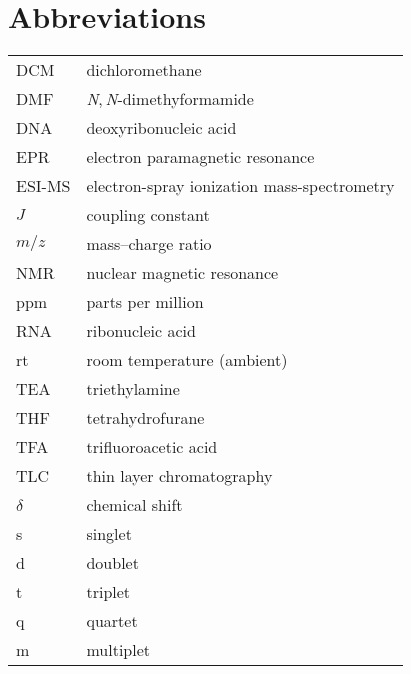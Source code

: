 \section*{Abbreviations}

\begin{table}[h]
\begin{tabular}{ll}
DCM & dichloromethane\\
DMF & \emph{N},\,\emph{N}-dimethyformamide\\
DNA	&	deoxyribonucleic acid\\
EPR	& electron paramagnetic resonance\\
ESI-MS & electron-spray ionization mass-spectrometry\\
$J$ & coupling constant\\
$m/z$ & mass--charge ratio\\
NMR	& nuclear magnetic resonance\\
ppm & parts per million\\ 
RNA & ribonucleic acid\\
rt & room temperature (ambient)\\
TEA & triethylamine\\
THF & tetrahydrofurane\\
TFA & trifluoroacetic acid\\
TLC & thin layer chromatography\\
$\delta$	&	chemical shift\\
s & singlet\\
d	&	doublet\\
t	&	triplet\\
q	&	quartet\\
m	&	multiplet\\
\end{tabular}\hfill\
\end{table}
